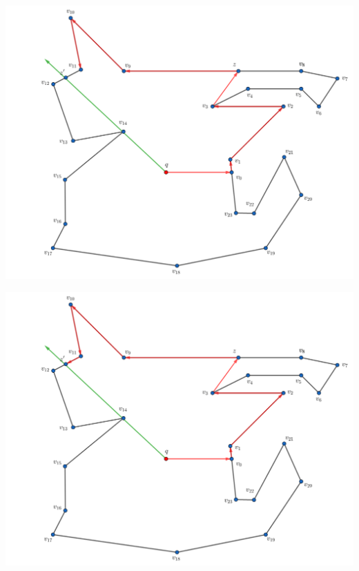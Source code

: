 \begin{frame}
  \centering \includegraphics[width=0.70 \paperwidth]{images/Ejecucion/e16.png}
\end{frame}

\begin{frame}
  \centering \includegraphics[width=0.70 \paperwidth]{images/Ejecucion/e17.png}
\end{frame}

